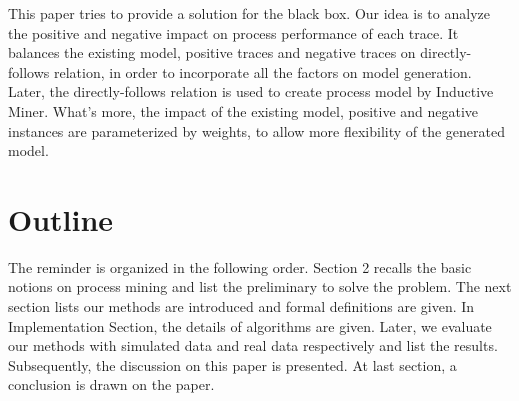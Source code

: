 This paper tries to provide a solution for the black box. Our idea is to analyze the positive and negative impact on process performance of each trace. It balances the existing model, positive traces and negative traces on directly-follows relation, in order to incorporate all the factors on model generation. Later, the directly-follows relation is used to create process model by Inductive Miner. What's more, the impact of the existing model, positive and negative instances are parameterized by weights, to allow more flexibility of the generated model.

\section{Outline}
The reminder is organized in the following order. Section 2 recalls the basic notions on process mining and list the preliminary to solve the problem. The next section lists our methods are introduced and formal definitions are given. In Implementation Section, the details of algorithms are given. Later, we evaluate our methods with simulated data and real data respectively and list the results. Subsequently, the discussion on this paper is presented. At last section, a conclusion is drawn on the paper. 


%